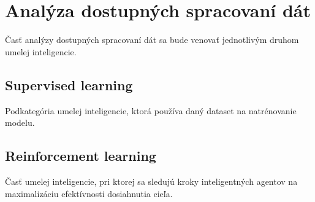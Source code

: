 \section{Analýza dostupných spracovaní dát}
Časť analýzy dostupných spracovaní dát sa bude venovať jednotlivým druhom umelej inteligencie.

\subsection{Supervised learning}
Podkategória umelej inteligencie, ktorá používa daný dataset na natrénovanie modelu.

\subsection{Reinforcement learning}
Časť umelej inteligencie, pri ktorej sa sledujú kroky inteligentných agentov na maximalizáciu efektívnosti dosiahnutia cieľa.
